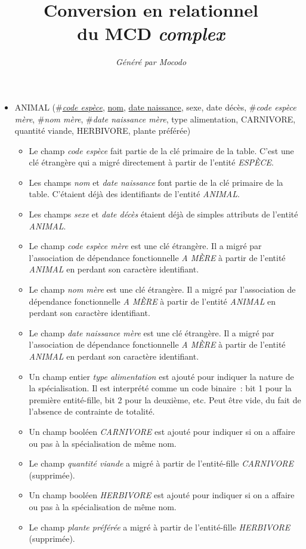 \documentclass[a4paper]{article}
\title{Conversion en relationnel\\du MCD \emph{complex}}
\author{\emph{Généré par Mocodo}}
\newcommand{\relat}[1]{\textsc{#1}}
\newcommand{\attr}[1]{#1}
\newcommand{\prim}[1]{\uline{#1}}
\newcommand{\foreign}[1]{\#\textsl{#1}}
\begin{document}
\maketitle

\begin{itemize}
  \item \relat{ANIMAL} (\foreign{\prim{code espèce}}, \prim{nom}, \prim{date naissance}, \attr{sexe}, \attr{date décès}, \foreign{code espèce mère}, \foreign{nom mère}, \foreign{date naissance mère}, \attr{type alimentation}, \attr{CARNIVORE}, \attr{quantité viande}, \attr{HERBIVORE}, \attr{plante préférée})
  \begin{itemize}
    \item Le champ \emph{code espèce} fait partie de la clé primaire de la table. C'est une clé étrangère qui a migré directement à partir de l'entité \emph{ESPÈCE}.
    \item Les champs \emph{nom} et \emph{date naissance} font partie de la clé primaire de la table. C'étaient déjà des identifiants de l'entité \emph{ANIMAL}.
    \item Les champs \emph{sexe} et \emph{date décès} étaient déjà de simples attributs de l'entité \emph{ANIMAL}.
    \item Le champ \emph{code espèce mère} est une clé étrangère. Il a migré par l'association de dépendance fonctionnelle \emph{A MÈRE} à partir de l'entité \emph{ANIMAL} en perdant son caractère identifiant.
    \item Le champ \emph{nom mère} est une clé étrangère. Il a migré par l'association de dépendance fonctionnelle \emph{A MÈRE} à partir de l'entité \emph{ANIMAL} en perdant son caractère identifiant.
    \item Le champ \emph{date naissance mère} est une clé étrangère. Il a migré par l'association de dépendance fonctionnelle \emph{A MÈRE} à partir de l'entité \emph{ANIMAL} en perdant son caractère identifiant.
    \item Un champ entier \emph{type alimentation} est ajouté pour indiquer la nature de la spécialisation. Il est interprété comme un code binaire : bit 1 pour la première entité-fille, bit 2 pour la deuxième, etc. Peut être vide, du fait de l'absence de contrainte de totalité.
    \item Un champ booléen \emph{CARNIVORE} est ajouté pour indiquer si on a affaire ou pas à la spécialisation de même nom.
    \item Le champ \emph{quantité viande} a migré à partir de l'entité-fille \emph{CARNIVORE} (supprimée).
    \item Un champ booléen \emph{HERBIVORE} est ajouté pour indiquer si on a affaire ou pas à la spécialisation de même nom.
    \item Le champ \emph{plante préférée} a migré à partir de l'entité-fille \emph{HERBIVORE} (supprimée).
  \end{itemize}


\end{itemize}
\end{document}
